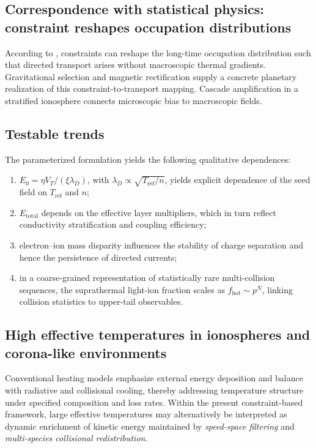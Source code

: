 \documentclass[11pt,a4paper]{article}
\begin{document}
\subsection{Correspondence with statistical physics: constraint reshapes occupation distributions}
According to \cite{peng2026entropydirectionmirrorstateparadox}, constraints can reshape the long-time occupation distribution such that directed transport arises without macroscopic thermal gradients. Gravitational selection and magnetic rectification supply a concrete planetary realization of this constraint-to-transport mapping. Cascade amplification in a stratified ionosphere connects microscopic bias to macroscopic fields.

\subsection{Testable trends}
The parameterized formulation yields the following qualitative dependences:
\begin{enumerate}
  \item $E_0=\eta V_T/(\xi\lambda_D)$, with $\lambda_D\propto \sqrt{T_{\mathrm{ref}}/n}$, yields explicit dependence of the seed field on $T_{\mathrm{ref}}$ and $n$;
  \item $E_{\mathrm{total}}$ depends on the effective layer multipliers, which in turn reflect conductivity stratification and coupling efficiency;
  \item electron--ion mass disparity influences the stability of charge separation and hence the persistence of directed currents;
  \item in a coarse-grained representation of statistically rare multi-collision sequences, the suprathermal light-ion fraction scales as $f_{\mathrm{hot}}\sim p^N$, linking collision statistics to upper-tail observables.
\end{enumerate}

\subsection{High effective temperatures in ionospheres and corona-like environments}
Conventional heating models emphasize external energy deposition and balance with radiative and collisional cooling, thereby addressing temperature structure under specified composition and loss rates. Within the present constraint-based framework, large effective temperatures may alternatively be interpreted as dynamic enrichment of kinetic energy maintained by \emph{speed-space filtering} and \emph{multi-species collisional redistribution}.
\end{document}
